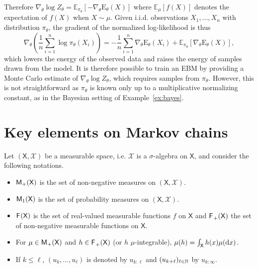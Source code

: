 \documentclass[english,graybox,envcountchap,envcountsame,sectrefs,shortlabels]{svmono}
\theoremstyle{style}
\newcommand{\eqsp}{}
\newcommand{\Xset}{\mathsf{X}}
\newcommand{\Xsigma}{\mathcal{X}}
\begin{document}
\begin{example}
Therefore $\nabla_\theta \log Z_\theta = \mathbb{E}_{\pi_\theta}[-\nabla_\theta \mathrm{E}_\theta(X)]$ where $\mathbb{E}_{\mu}[f(X)]$ denotes the expectation of $f(X)$ when $X\sim \mu$. Given i.i.d. observations $X_1,\ldots,X_n$ with distribution $\pi_\theta$, the gradient of the normalized log-likelihood is thus
$$
\nabla_\theta \left(\frac{1}{n}\sum_{i=1}^n \log\pi_\theta(X_i)\right) = -\frac{1}{n}\sum_{i=1}^n \nabla_\theta\mathrm{E}_\theta(X_i) +  \mathbb{E}_{\pi_\theta}[\nabla_\theta \mathrm{E}_\theta(X)]\eqsp,
$$
which lowers the energy of the observed data and raises the energy of samples drawn from the model. It is therefore possible to train an EBM by providing a Monte Carlo estimate of $\nabla_\theta \log Z_\theta$, which requires samples from $\pi_\theta$. However, this is not straightforward as $\pi_\theta$ is known only up to a multiplicative normalizing constant, as in the Bayesian setting of Example~\ref{ex:bayes}.
\end{example}



\section{Key elements on Markov chains}
Let $(\Xset,\Xsigma)$ be a measurable space, i.e.  $\Xsigma$ is a $\sigma$-algebra on $\Xset$, and consider the following notations.
\begin{itemize}[-]
\item $\meas +(\Xset)$ is the set of non-negative measures on $(\Xset,\Xsigma)$.
\item $\meas 1(\Xset)$ is the set of probability measures on $(\Xset,\Xsigma)$.
\item $\funcset{}(\Xset)$ is the set of real-valued measurable functions
$f$ on $\Xset$ and $\funcset{}_{+}(\Xset)$ the set of non-negative measurable
functions on $\Xset$.
\item For $\mu\in\meas +(\Xset)$ and $h\in\funcset{}_{+}(\Xset)$ (or $h$ $\mu$-integrable), $\mu(h) = \int_\Xset h(x)\mu(\rmd x)$.
\item If $k\leq\ell$, $(u_{k},\ldots,u_{\ell})$ is denoted by $u_{k:\ell}$   and $(u_{k+\ell})_{\ell\in\mathbb{N}}$ by $u_{k:\infty}$.
\end{itemize}
\end{document}
